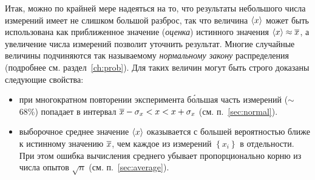 

Итак, можно по крайней мере надеяться на то, что результаты небольшого числа
измерений имеет не слишком большой разброс, так что величина $\left<x\right>$
может быть использована как приближенное значение (\emph{оценка}) истинного значения
$\left<x\right>\approx \overline{x}$,
а увеличение числа измерений позволит уточнить результат.
Многие случайные величины подчиняются так называемому \emph{нормальному закону}
распределения (подробнее см. раздел~\ref{ch:prob}). Для таких величин
могут быть строго доказаны следующие свойства:
\begin{itemize}
    \item при многократном повторении эксперимента б\'{о}льшая часть измерений
    ($\sim$68\%) попадает в интервал $\overline{x}-\sigma_{x}<x<x+\sigma_{x}$
    (см. п.~\ref{sec:normal}).
    \item выборочное среднее значение $\left<x\right>$ оказывается с большей
    вероятностью ближе к истинному значению $\overline{x}$, чем каждое из измерений
    $\left\{x_i\right\}$ в отдельности. При этом ошибка вычисления среднего
    убывает пропорционально корню из числа опытов $\sqrt{n}$
    (см. п.~\ref{sec:average}).
\end{itemize}

%


